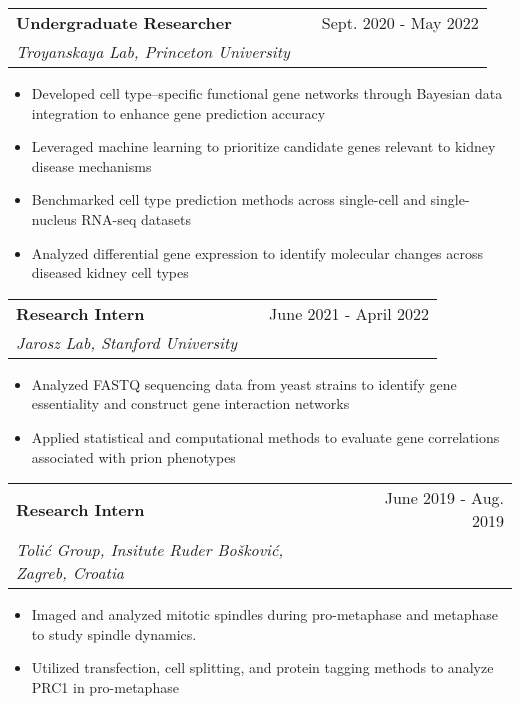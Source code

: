 \documentclass[a4paper,12pt]{article}
\makeatletter
\newenvironment{joblong}[3]
    {
    \begin{tabularx}{\linewidth}{@{}l X r@{}}
    \textbf{#1} & \hfill &  #2 \\
    \textit{#3} & & \\[3.75pt]  
    \end{tabularx}
    \begin{minipage}[t]{\linewidth}
    \begin{itemize}[nosep,after=\strut, leftmargin=1em, itemsep=3pt,label=\scriptsize$\bullet$]
    }
    {
    \end{itemize}
    \end{minipage}    
    }
\makeatother
\begin{document}
\begin{joblong}{Undergraduate Researcher}{Sept. 2020 - May 2022}{Troyanskaya Lab, Princeton University}
\item Developed cell type–specific functional gene networks through Bayesian data integration to enhance gene prediction accuracy
\item Leveraged machine learning to prioritize candidate genes relevant to kidney disease mechanisms
\item Benchmarked cell type prediction methods across single-cell and single-nucleus RNA-seq datasets 
\item Analyzed differential gene expression to identify molecular changes across diseased kidney cell types
\end{joblong}



\begin{joblong}{Research Intern}{June 2021 - April 2022}{Jarosz Lab, Stanford University}
\item Analyzed FASTQ sequencing data from yeast strains to identify gene essentiality and construct gene interaction networks
\item Applied statistical and computational methods to evaluate gene correlations associated with prion phenotypes
\end{joblong}

\begin{joblong}{Research Intern}{June 2019 - Aug. 2019}{Tolić Group, Insitute Ruder Bošković, Zagreb, Croatia}
\item Imaged and analyzed mitotic spindles during pro-metaphase and metaphase to study spindle dynamics.
\item Utilized transfection, cell splitting, and protein tagging methods to analyze PRC1 in pro-metaphase
\end{joblong}
\end{document}
